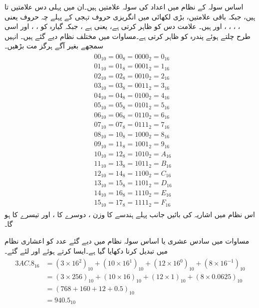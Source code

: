 	اساس سولہ کے نظام میں اعداد کی سولہ علامتیں ہیں۔ان میں پہلی دس علامتیں  تا  ہیں، جبکہ باقی علامتیں، بڑی لکھائی میں انگریزی حروف تہجی کے پہلے چہ حروف یعنی ، ، ، ،  اور  ہیں۔ علامت  دس  کو ظاہر کرتی ہے، یعنی  ہے ، جبکہ  گیارہ کو ، ، اور اسی طرح چلتے ہوئے  پندرہ کو ظاہر کرتی ہے۔مساوات  میں مختلف نظام دیے گئے ہیں۔ انہیں سمجھے بغیر آگے ہرگز مت بڑھیں۔ 
\begin{gather}
\begin{aligned}\label{مساوات_ثنائی_تمام}
&00_{10}=00_8=0000_2=0_{16}\\
&01_{10}=01_8=0001_2=1_{16}\\
&02_{10}=02_8=0010_2=2_{16}\\
&03_{10}=03_8=0011_2=3_{16}\\
&04_{10}=04_8=0100_2=4_{16}\\
&05_{10}=05_8=0101_2=5_{16}\\
&06_{10}=06_8=0110_2=6_{16}\\
&07_{10}=07_8=0111_2=7_{16}\\
&08_{10}=10_8=1000_2=8_{16}\\
&09_{10}=11_8=1001_2=9_{16}\\
&10_{10}=12_8=1010_2=A_{16}\\
&11_{10}=13_8=1011_2=B_{16}\\
&12_{10}=14_8=1100_2=C_{16}\\
&13_{10}=15_8=1101_2=D_{16}\\
&14_{10}=16_8=1110_2=E_{16}\\
&15_{10}=17_8=1111_2=F_{16}
\end{aligned}
\end{gather}
	اس نظام میں اشاریہ کی بائیں جانب پہلے ہندسے کا وزن ، دوسرے کا ، اور تیسرے کا  ہو گا۔ 

مساوات  میں سادس عشری یا اساس سولہ نظام میں دیے گئے عدد کو اعشاری نظام میں تبدیل کرنا دکھایا گیا ہے۔ایسا کرتے ہوئے  اور  لئے گئے۔
\begin{gather}
\begin{aligned}\label{مساوات_ثنائی_سادس}
3AC.8_{16}&=(3\times 16^2)_{10}+(10\times 16^1)_{10}+(12\times 16^0)_{10}+(8\times 16^{-1})_{10}\\
&=(3\times 256)_{10}+(10\times 16)_{10}+(12\times 1)_{10}+(8\times 0.0625)_{10}\\
&=(768+160+12+0.5)_{10}\\
&=940.5_{10}
\end{aligned}
\end{gather}

